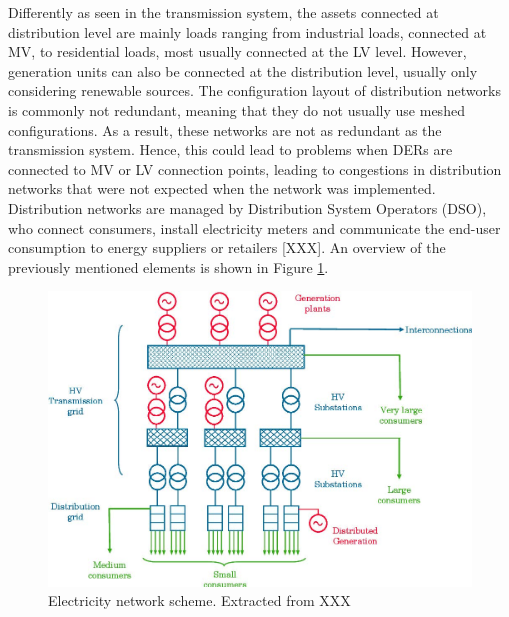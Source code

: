 Differently as seen in the transmission system, the assets connected at distribution level are mainly loads ranging from industrial loads, connected at MV, to residential loads, most usually connected at the LV level. However, generation units can also be connected  at the distribution level, usually only considering renewable sources. The configuration layout of distribution networks is commonly not redundant, meaning that they do not usually use meshed configurations. As a result, these networks are not as redundant as the transmission system. Hence, this could lead to problems when DERs are connected to MV or LV connection points, leading to congestions  in distribution networks that were not expected when the network was implemented. Distribution networks are managed by Distribution System Operators (DSO), who connect consumers, install electricity meters and communicate the end-user consumption to energy suppliers or retailers [XXX]. An overview of the previously mentioned elements is shown in Figure \ref{fig:networkscheme}. 


\begin{figure}[h]
	\centering 
	\includegraphics[width=0.8\columnwidth ]{ChapterIntro/Figures/ELECTRICITY_SYSTEM.jpg}
		\caption{Electricity network scheme. Extracted from XXX}  
		\label{fig:networkscheme}
\end{figure}


